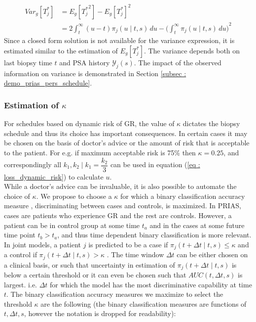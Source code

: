\begin{equation}
\begin{split}
Var_g[T^*_j] &= E_g[{T^*_j}^2] - {E_g[T^*_j]}^2\\
&= 2 \int_t^\infty {(u-t) \pi_j(u \mid t, s) \,du} - {\bigg(\int_t^\infty \pi_j(u \mid t, s) \,du\bigg)}^2
\end{split}
\end{equation}
Since a closed form solution is not available for the variance expression, it is estimated similar to the estimation of $E_g[T^*_j]$. The variance depends both on last biopsy time $t$ and PSA history $\mathcal{Y}_j(s)$. The impact of the observed information on variance is demonstrated in Section \ref{subsec : demo_prias_pers_schedule}.

\subsubsection{Estimation of $\kappa$}
\label{subsubsec : kappa_estimation}
For schedules based on dynamic risk of GR, the value of $\kappa$ dictates the biopsy schedule and thus its choice has important consequences. In certain cases it may be chosen on the basis of doctor's advice or the amount of risk that is acceptable to the patient. For e.g. if maximum acceptable risk is 75\% then $\kappa = 0.25$, and correspondingly all $k_1, k_2 \mid k_1=\dfrac{k_2}{3}$ can be used in equation (\ref{eq : loss_dynamic_risk}) to calculate $u$.\\

While a doctor's advice can be invaluable, it is also possible to automate the choice of $\kappa$. We propose to choose a $\kappa$ for which a binary classification accuracy measure \citep{lopez2014optimalcutpoints,sokolova2009systematic}, discriminating between cases and controls, is maximized. In PRIAS, cases are patients who experience GR and the rest are controls. However, a patient can be in control group at some time $t_a$ and in the cases at some future time point $t_b > t_a$, and thus time dependent binary classification is more relevant. In joint models, a patient $j$ is predicted to be a case if $\pi_j(t + \Delta t \mid t,s) \leq \kappa$ and a control if $\pi_j(t + \Delta t \mid t,s) > \kappa$ \citep{rizopoulosJMbayes}. The time window $\Delta t$ can be either chosen on a clinical basis, or such that uncertainty in estimation of $\pi_j(t + \Delta t \mid t,s)$ is below a certain threshold or it can even be chosen such that $AUC(t, \Delta t, s)$ \citep{rizopoulosJMbayes} is largest. i.e. $\Delta t$ for which the model has the most discriminative capability at time $t$. The binary classification accuracy measures we maximize to select the threshold $\kappa$ are the following (the binary classification measures are functions of $t, \Delta t, s$, however the notation is dropped for readability): 

